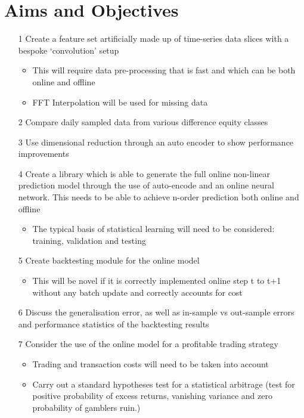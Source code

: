 \documentclass[a4paper,latin]{paper}
\begin{document}
\section{Aims and Objectives}  
\begin{itemize}
\item[1] Create a feature set artificially made up of time-series data slices with a bespoke ‘convolution’ setup  \begin{itemize}
\item This will require data pre-processing that is fast and which can be both online and offline
\item FFT Interpolation will be used for missing data
\end{itemize}
\item[2] Compare daily sampled data from various difference equity classes
\item[3] Use dimensional reduction through an auto encoder to show performance 
improvements
\item[4] Create a library which is able to generate the full online non-linear prediction model through the use of auto-encode and an online neural network. This needs to be able to achieve n-order prediction both online and offline
\begin{itemize}
\item The typical basis of statistical learning will need to be considered: training, validation and testing
\end{itemize}
\item[5] Create backtesting module for the online model
\begin{itemize}
\item This will be novel if it is correctly implemented online step t to t+1 without any batch update and correctly accounts for cost
\end{itemize}
\item[6] Discuss the generalisation error, as well as in-sample vs out-sample errors and performance statistics of the backtesting results
\item[7] Consider the use of the online model for a profitable trading strategy \begin{itemize}
\item Trading and transaction costs will need to be taken into account
\item Carry out a standard hypotheses test for a statistical arbitrage (test for positive probability of excess returns, vanishing variance and zero probability of gamblers ruin.)
\end{itemize}
\end{itemize}
\end{document}
